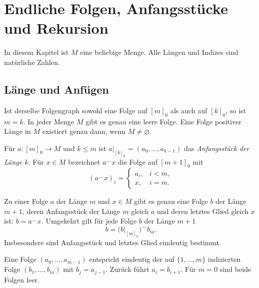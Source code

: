 \chapter{Endliche Folgen, Anfangsstücke und Rekursion}
\label{b21guide:ch:finite}

In diesem Kapitel ist $M$ eine beliebige Menge.
Alle Längen und Indizes sind natürliche Zahlen.

\section{Länge und Anfügen}

\begin{theorem}
\label{b21guide:thm:length}
Ist derselbe Folgengraph sowohl eine Folge auf $[m]_0$ als auch
auf $[k]_0$, so ist $m=k$.
In jeder Menge $M$ gibt es genau eine leere Folge.
Eine Folge positiver Länge in $M$ existiert genau dann,
wenn $M\ne\varnothing$.
\end{theorem}

\begin{definition}
Für $a\colon[m]_0\to M$ und $k\leq m$ ist
$a|_{[k]_0}=(a_0,\ldots,a_{k-1})$ das \emph{Anfangsstück
der Länge $k$}. Für $x\in M$ bezeichnet $a^\frown x$
die Folge auf $[m+1]_0$ mit
\[
 (a^\frown x)_i=
 \begin{cases}
 a_i,&i<m,\\
 x,&i=m.
 \end{cases}
\]
\end{definition}

\begin{theorem}
\label{b21guide:thm:append}
Zu einer Folge $a$ der Länge $m$ und $x\in M$ gibt es genau
eine Folge $b$ der Länge $m+1$, deren Anfangsstück der Länge
$m$ gleich $a$ und deren letztes Glied gleich $x$ ist:
$b=a^\frown x$.
Umgekehrt gilt für jede Folge $b$ der Länge $m+1$
\[
 b=\bigl(b|_{[m]_0}\bigr)^\frown b_m.
\]
Insbesondere sind Anfangsstück und letztes Glied eindeutig bestimmt.
\end{theorem}

\begin{theorem}
Eine Folge $(a_0,\ldots,a_{m-1})$ entspricht eindeutig
der auf $\{1,\ldots,m\}$ indizierten Folge
$(b_1,\ldots,b_m)$ mit $b_j=a_{j-1}$.
Zurück führt $a_i=b_{i+1}$. Für $m=0$ sind beide Folgen leer.
\end{theorem}

